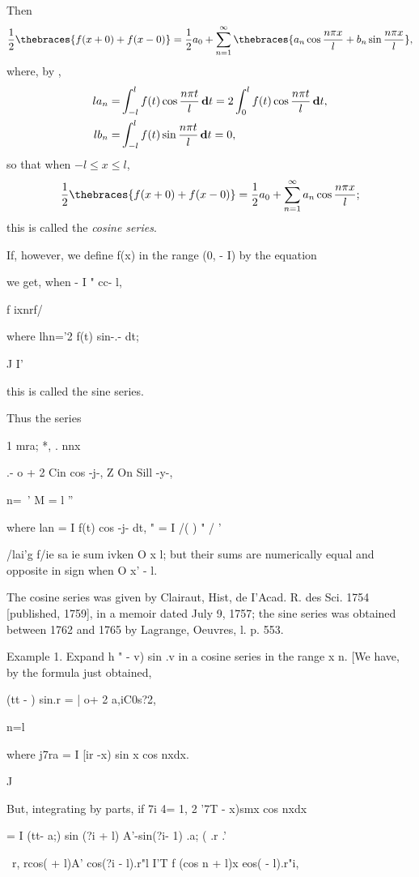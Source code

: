 Then
$$
\half \thebraces{ f(x+0) + f(x-0) }
=
\half a_{0}
+
\sum_{n=1}^{\infty} \thebraces{
  a_{n} \cos \frac{n \pi x}{l}
  +
  b_{n} \sin \frac{n \pi x}{l}
},
$$
where, by ,
\begin{align*}
  l a_{n}
  =&
  \int_{-l}^{l} f(t) \cos \frac{n \pi t}{l} \, \mathbf{d} t
  =
  2 \int_{0}^{l} f(t) \cos \frac{n \pi t}{l} \, \mathbf{d} t,
  \\
  l b_{n}
  =&
  \int_{-l}^{l} f(t) \sin \frac{n \pi t}{l} \, \mathbf{d} t
  = 0,
\end{align*}
so that when $-l \leq x \leq l$,
$$
\half \thebraces{ f(x+0) + f(x-0) }
=
\half a_{0} + \sum_{n=1}^{\infty} a_{n} \cos \frac{n \pi x}{l};
$$
this is called the \emph{cosine series}.

If, however, we define f(x) in the range (0, - I) by the equation

%
%

we get, when - I " cc- l,

f ixnrf/

where lhn='2 f(t) sin-.- dt;

J I'

this is called the sine series.

Thus the series

1 mra; *, . nnx

.- o + 2 Cin cos -j-, Z On Sill -y-,

  n=\ ' M = l ''

where lan = I f(t) cos -j- dt, " = I /( ) " / '

/lai'g f/ie sa ie sum ivken O x l; but their sums are numerically
equal and opposite in sign when O x' - l.

The cosine series was given by Clairaut, Hist, de I'Acad. R. des Sci.
1754 [published, 1759], in a memoir dated July 9, 1757; the sine
series was obtained between 1762 and 1765 by Lagrange, Oeuvres, l. p.
553.

Example 1. Expand h " - v) sin .v in a cosine series in the range x n.
[We have, by the formula just obtained,

  (tt - ) sin.r = | o+ 2 a,iC0s?2,

n=l

where j7ra = I [ir -x) sin x cos nxdx.

J

But, integrating by parts, if 7i 4= 1, 2 '7T - x)smx cos nxdx

= I (tt- a;) sin (?i + l) A'-sin(?i- 1) .a; ( .r .'

\ r, rcos( + l)A' cos(?i - l).r"l I'T f (cos n + l)x eos( - l).r"i,

